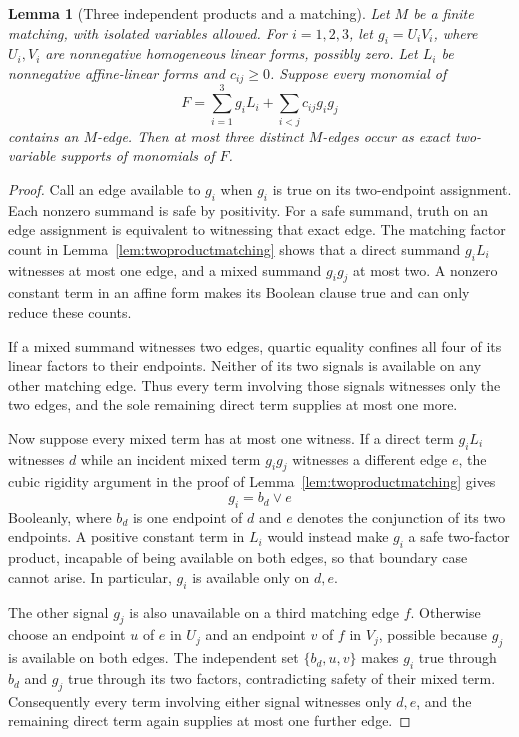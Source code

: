 \documentclass[11pt]{article}
\newtheorem{lemma}[theorem]{Lemma}
\theoremstyle{definition}
\theoremstyle{remark}
\begin{document}
\begin{lemma}[Three independent products and a matching]\label{lem:threeindependentmatching}
Let $M$ be a finite matching, with isolated variables allowed. For $i=1,2,3$, let $g_i=U_iV_i$, where $U_i,V_i$ are nonnegative homogeneous linear forms, possibly zero. Let $L_i$ be nonnegative affine-linear forms and $c_{ij}\ge0$. Suppose every monomial of
\[
 F=\sum_{i=1}^3g_iL_i+\sum_{i<j}c_{ij}g_ig_j
\]
contains an $M$-edge. Then at most three distinct $M$-edges occur as exact two-variable supports of monomials of $F$.
\end{lemma}
\begin{proof}
Call an edge available to $g_i$ when $g_i$ is true on its two-endpoint assignment. Each nonzero summand is safe by positivity. For a safe summand, truth on an edge assignment is equivalent to witnessing that exact edge. The matching factor count in Lemma~\ref{lem:twoproductmatching} shows that a direct summand $g_iL_i$ witnesses at most one edge, and a mixed summand $g_ig_j$ at most two. A nonzero constant term in an affine form makes its Boolean clause true and can only reduce these counts.

If a mixed summand witnesses two edges, quartic equality confines all four of its linear factors to their endpoints. Neither of its two signals is available on any other matching edge. Thus every term involving those signals witnesses only the two edges, and the sole remaining direct term supplies at most one more.

Now suppose every mixed term has at most one witness. If a direct term $g_iL_i$ witnesses $d$ while an incident mixed term $g_ig_j$ witnesses a different edge $e$, the cubic rigidity argument in the proof of Lemma~\ref{lem:twoproductmatching} gives
\[
 g_i=b_d\vee e
\]
Booleanly, where $b_d$ is one endpoint of $d$ and $e$ denotes the conjunction of its two endpoints. A positive constant term in $L_i$ would instead make $g_i$ a safe two-factor product, incapable of being available on both edges, so that boundary case cannot arise. In particular, $g_i$ is available only on $d,e$.

The other signal $g_j$ is also unavailable on a third matching edge $f$. Otherwise choose an endpoint $u$ of $e$ in $U_j$ and an endpoint $v$ of $f$ in $V_j$, possible because $g_j$ is available on both edges. The independent set $\{b_d,u,v\}$ makes $g_i$ true through $b_d$ and $g_j$ true through its two factors, contradicting safety of their mixed term. Consequently every term involving either signal witnesses only $d,e$, and the remaining direct term again supplies at most one further edge.


\end{proof}
\end{document}

